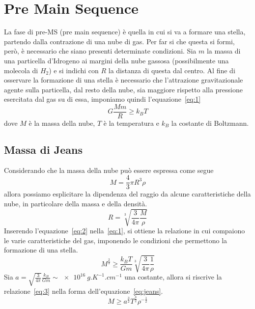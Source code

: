 \section{Pre Main Sequence}\label{sec:pre-main-sequence}

La fase di pre-MS (pre main sequence) è quella in cui si va a formare una stella, partendo dalla contrazione di una nube di gas. Per far si che questa si formi, però, è necessario che siano presenti determinate condizioni. Sia $m$ la massa di una particella d'Idrogeno ai margini della nube gassosa (possibilmente una molecola di $H_2$) e si indichi con $R$ la distanza di questa dal centro. Al fine di osservare la formazione di una stella è necessario che l'attrazione gravitazionale agente sulla particella, dal resto della nube, sia maggiore rispetto alla pressione esercitata dal gas su di essa, imponiamo quindi l'equazione~\eqref{eq:1}
\begin{equation}
    G \frac{M m}{R} \geq k_B T
    \label{eq:1}
\end{equation}
dove $M$ è la massa della nube, $T$ è la temperatura e $k_B$ la costante di Boltzmann.
\subsection{Massa di Jeans}\label{sec:massa-jeans}

Considerando che la massa della nube può essere espressa come segue
\[
    M = \frac{4}{3} \pi R^3 \rho
\]
allora possiamo esplicitare la dipendenza del raggio da alcune caratteristiche della nube, in particolare della massa e della densità.
\begin{equation}
    R = \sqrt[3]{\frac{3}{4\pi} \frac{M}{\rho}}
    \label{eq:2}
\end{equation}
Inserendo l'equazione~\eqref{eq:2} nella~\eqref{eq:1}, si ottiene la relazione in cui compaiono le varie caratteristiche del gas, imponendo le condizioni che permettono la formazione di una stella.
\begin{equation}
    M^{\frac{2}{3}} \geq \frac{k_B T}{G m} \sqrt[3]{\frac{3}{4\pi} \frac{1}{\rho}}
    \label{eq:3}
\end{equation}
Sia $a = \sqrt{\frac{3}{4\pi}}\frac{k_B}{G m} \sim \SI{e16}{g.K^{-1}.cm^{-1}}$ una costante, allora si riscrive la relazione~\eqref{eq:3} nella forma dell'equazione~\eqref{eq:jeans}.
\begin{equation}
    M \geq a^{\frac{3}{2}} T^{\frac{3}{2}} \rho^{-\frac{1}{2}}
\label{eq:jeans}
\end{equation}

